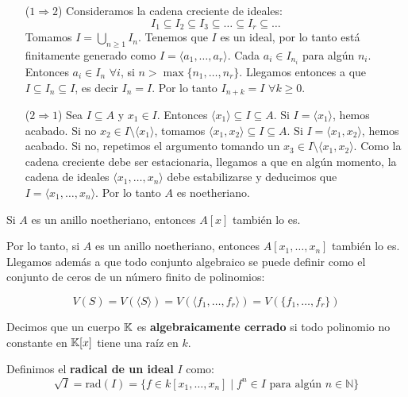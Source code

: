 \documentclass[ACGA.tex]{subfiles}
\begin{document}
\begin{dem}\mbox{}
\begin{itemize}
	\item[($1\Rightarrow 2$)]
	Consideramos la cadena creciente de ideales:
	\[ I_1 \subseteq I_2 \subseteq I_3 \subseteq \dots \subseteq I_r \subseteq \dots \]
	Tomamos $I = \bigcup_{n\geq 1} I_n$. Tenemos que $I$ es un ideal, por lo tanto está finitamente generado como $I = \langle a_1, \dots, a_r \rangle$. Cada $a_i \in I_{n_i}$ para algún $n_i$. Entonces $a_i \in I_n$  $\forall i$, si $n > \max\{n_1,\dots,n_r\}$. Llegamos entonces a que $I \subseteq I_n \subseteq I$, es decir $I_n = I$. Por lo tanto $I_{n+k} = I$ $\forall k \geq 0$. 

	\item[($2\Rightarrow 1$)]
	Sea $I \subseteq A$ y $x_1 \in I$. Entonces $\langle x_1 \rangle \subseteq I \subseteq A$. Si $I = \langle x_1 \rangle$, hemos acabado. Si no $x_2 \in I \setminus \langle x_1 \rangle$, tomamos $\langle x_1, x_2 \rangle \subseteq I \subseteq A$. Si $I = \langle x_1, x_2 \rangle$, hemos acabado. Si no, repetimos el argumento tomando un $x_3 \in I \setminus \langle x_1,x_2 \rangle$. Como la cadena creciente debe ser estacionaria, llegamos a que en algún momento, la cadena de ideales $\langle x_1,\dots,x_n\rangle$ debe estabilizarse y deducimos que $I = \langle x_1,\dots,x_n\rangle$. Por lo tanto $A$ es noetheriano. \QED

\end{itemize}
\end{dem}

\begin{teorema}
Si $A$ es un anillo noetheriano, entonces $A[x]$ también lo es.
\end{teorema}

Por lo tanto, si $A$ es un anillo noetheriano, entonces $A[x_1,\dots,x_n]$ también lo es. Llegamos además a que todo conjunto algebraico se puede definir como el conjunto de ceros de un número finito de polinomios:

\[ V(S) = V(\langle S \rangle) = V(\langle f_1,\dots,f_r\rangle) =  V(\{f_1,\dots,f_r\}) \]

\begin{defi}
Decimos que un cuerpo $\mathbb{K}$ es \textbf{algebraicamente cerrado} si todo polinomio no constante en $\mathbb{K}[x]$ tiene una raíz en $k$.
\end{defi}

\begin{defi}
Definimos el \textbf{radical de un ideal} $I$ como:
\[ \sqrt{I} = \text{rad}(I) = \{f \in k[x_1,\dots,x_n] \mid f^n \in I \text{ para algún }n \in \mathbb{N}\} \]
\end{defi}
\end{document}
